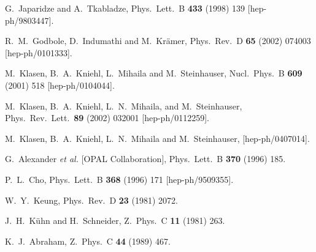 \begin{thebibliography}{999}
G.~Japaridze and A.~Tkabladze,
Phys.\ Lett.\ B {\bf 433} (1998) 139
[hep-ph/9803447].

R.~M.~Godbole, D.~Indumathi and M.~Kr\"amer,
Phys.\ Rev.\ D {\bf 65} (2002) 074003
[hep-ph/0101333].

M.~Klasen, B.~A.~Kniehl, L.~Mihaila and M.~Steinhauser,
Nucl.\ Phys.\ B {\bf 609} (2001) 518
[hep-ph/0104044].

M.~Klasen, B.~A.~Kniehl, L.~N.~Mihaila, and M.~Steinhauser,
Phys.\ Rev.\ Lett.\  {\bf 89} (2002) 032001
[hep-ph/0112259].

M.~Klasen, B.~A.~Kniehl, L.~N.~Mihaila and M.~Steinhauser,
[hep-ph/0407014].


G.~Alexander {\it et al.}  [OPAL Collaboration],
Phys.\ Lett.\ B {\bf 370} (1996) 185.

P.~L.~Cho,
Phys.\ Lett.\ B {\bf 368} (1996) 171
[hep-ph/9509355].

W.~Y.~Keung,
Phys.\ Rev.\ D {\bf 23} (1981) 2072.

J.~H.~K\"uhn and H.~Schneider,
Z.\ Phys.\ C {\bf 11} (1981) 263.

K.~J.~Abraham,
Z.\ Phys.\ C {\bf 44} (1989) 467.


\end{thebibliography}
